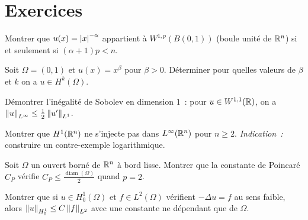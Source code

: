 \section{Exercices}

\begin{exercice}
Montrer que $u(x) = \left| x \right|^{-\alpha}$ appartient \`a $W^{1,p}(B(0,1))$
(boule unit\'e de $\mathbb{R}^n$) si et seulement si $(\alpha + 1)p < n$.
\end{exercice}

\begin{exercice}
Soit $\Omega = (0,1)$ et $u(x) = x^\beta$ pour $\beta > 0$. D\'eterminer pour
quelles valeurs de $\beta$ et $k$ on a $u \in H^k(\Omega)$.
\end{exercice}

\begin{exercice}
D\'emontrer l'in\'egalit\'e de Sobolev en dimension $1$~: pour $u \in W^{1,1}(\mathbb{R})$,
on a $\left\| u \right\|_{L^\infty} \leq \frac{1}{2}\left\| u' \right\|_{L^1}$.
\end{exercice}

\begin{exercice}
Montrer que $H^1(\mathbb{R}^n)$ ne s'injecte pas dans $L^\infty(\mathbb{R}^n)$ pour $n \geq 2$.
\emph{Indication~:} construire un contre-exemple logarithmique.
\end{exercice}

\begin{exercice}
Soit $\Omega$ un ouvert born\'e de $\mathbb{R}^n$ \`a bord lisse. Montrer que la constante
de Poincar\'e $C_P$ v\'erifie $C_P \leq \frac{\operatorname{diam}(\Omega)}{2}$ quand $p = 2$.
\end{exercice}

\begin{exercice}
Montrer que si $u \in H^1_0(\Omega)$ et $f \in L^2(\Omega)$ v\'erifient $-\Delta u = f$
au sens faible, alors $\left\| u \right\|_{H^1_0} \leq C\left\| f \right\|_{L^2}$ avec une constante
ne d\'ependant que de $\Omega$.
\end{exercice}
